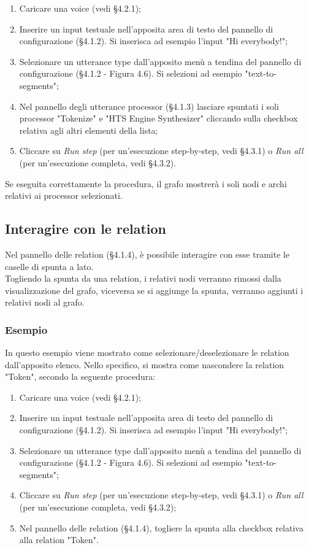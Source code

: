 \documentclass[openany,12pt,a4paper]{report}
\begin{document}
	\begin{enumerate}
		
		\item Caricare una voice (vedi §4.2.1);
		\item Inserire un input testuale nell'apposita area di testo del pannello di configurazione (§4.1.2). Si inserisca ad esempio l'input "Hi everybody!";
		\item Selezionare un utterance type dall'apposito menù a tendina del pannello di configurazione (§4.1.2 - Figura 4.6). Si selezioni ad esempio "text-to-segments";
		\item Nel pannello degli utterance processor (§4.1.3) lasciare spuntati i soli processor "Tokenize" e "HTS Engine Synthesizer" cliccando sulla checkbox relativa agli altri elementi della lista;
		\item Cliccare su \textit{Run step} (per un'esecuzione step-by-step, vedi §4.3.1) o \textit{Run all} (per un'esecuzione completa, vedi §4.3.2).
	\end{enumerate}

	\noindent Se eseguita correttamente la procedura, il grafo mostrerà i soli nodi e archi relativi ai processor selezionati.
	
	\subsection{Interagire con le relation}
	Nel pannello delle relation (§4.1.4), è possibile interagire con esse tramite le caselle di spunta a lato.\\
	Togliendo la spunta da una relation, i relativi nodi verranno rimossi dalla visualizzazione del grafo, viceversa se si aggiunge la spunta, verranno aggiunti i relativi nodi al grafo.
	
	\subsubsection*{Esempio}
	
	In questo esempio viene mostrato come selezionare/deselezionare le relation dall'apposito elenco. Nello specifico, si mostra come nascondere la relation "Token", secondo la seguente procedura:
	
	\begin{enumerate}
		\item Caricare una voice (vedi §4.2.1);
		\item Inserire un input testuale nell'apposita area di testo del pannello di configurazione (§4.1.2). Si inserisca ad esempio l'input "Hi everybody!";
		\item Selezionare un utterance type dall'apposito menù a tendina del pannello di configurazione (§4.1.2 - Figura 4.6). Si selezioni ad esempio "text-to-segments";
		\item Cliccare su \textit{Run step} (per un'esecuzione step-by-step, vedi §4.3.1) o \textit{Run all} (per un'esecuzione completa, vedi §4.3.2);
		\item Nel pannello delle relation (§4.1.4), togliere la spunta alla checkbox relativa alla relation "Token".
	\end{enumerate}
	
\end{document}
